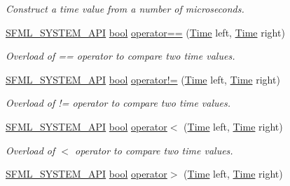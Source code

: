 \begin{DoxyCompactItemize}
\begin{DoxyCompactList}\small\item\em Construct a time value from a number of microseconds. \end{DoxyCompactList}\item 
\hyperlink{sfml_2dep_2_s_f_m_l-2_84_82_2include_2_s_f_m_l_2_system_2_export_8hpp_a6476c9e422606477a4c23d92b1d79a1f}{S\-F\-M\-L\-\_\-\-S\-Y\-S\-T\-E\-M\-\_\-\-A\-P\-I} \hyperlink{term__entry_8h_a002004ba5d663f149f6c38064926abac}{bool} \hyperlink{classsf_1_1_time_a2b8453227f651e9d5db3663fa08c47e2}{operator==} (\hyperlink{classsf_1_1_time}{Time} left, \hyperlink{classsf_1_1_time}{Time} right)
\begin{DoxyCompactList}\small\item\em Overload of == operator to compare two time values. \end{DoxyCompactList}\item 
\hyperlink{sfml_2dep_2_s_f_m_l-2_84_82_2include_2_s_f_m_l_2_system_2_export_8hpp_a6476c9e422606477a4c23d92b1d79a1f}{S\-F\-M\-L\-\_\-\-S\-Y\-S\-T\-E\-M\-\_\-\-A\-P\-I} \hyperlink{term__entry_8h_a002004ba5d663f149f6c38064926abac}{bool} \hyperlink{classsf_1_1_time_ae06b561f6422ec8ca414d400efd2cf4b}{operator!=} (\hyperlink{classsf_1_1_time}{Time} left, \hyperlink{classsf_1_1_time}{Time} right)
\begin{DoxyCompactList}\small\item\em Overload of != operator to compare two time values. \end{DoxyCompactList}\item 
\hyperlink{sfml_2dep_2_s_f_m_l-2_84_82_2include_2_s_f_m_l_2_system_2_export_8hpp_a6476c9e422606477a4c23d92b1d79a1f}{S\-F\-M\-L\-\_\-\-S\-Y\-S\-T\-E\-M\-\_\-\-A\-P\-I} \hyperlink{term__entry_8h_a002004ba5d663f149f6c38064926abac}{bool} \hyperlink{classsf_1_1_time_ac222933174ddcff5d14c3ac7d1020d54}{operator$<$} (\hyperlink{classsf_1_1_time}{Time} left, \hyperlink{classsf_1_1_time}{Time} right)
\begin{DoxyCompactList}\small\item\em Overload of $<$ operator to compare two time values. \end{DoxyCompactList}\item 
\hyperlink{sfml_2dep_2_s_f_m_l-2_84_82_2include_2_s_f_m_l_2_system_2_export_8hpp_a6476c9e422606477a4c23d92b1d79a1f}{S\-F\-M\-L\-\_\-\-S\-Y\-S\-T\-E\-M\-\_\-\-A\-P\-I} \hyperlink{term__entry_8h_a002004ba5d663f149f6c38064926abac}{bool} \hyperlink{classsf_1_1_time_a23978402846bf3c7ac54a3f2c6b397a2}{operator$>$} (\hyperlink{classsf_1_1_time}{Time} left, \hyperlink{classsf_1_1_time}{Time} right)

\end{DoxyCompactItemize}
